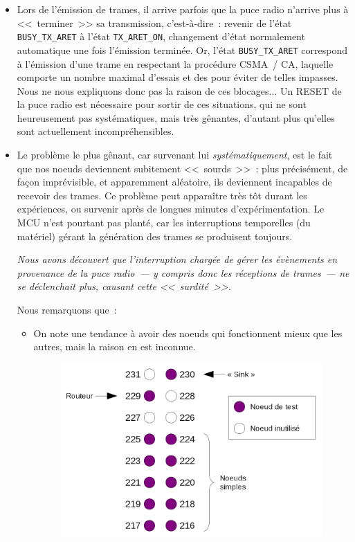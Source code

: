 \begin{itemize}
\item Lors de l'émission de trames, il arrive parfois que la puce radio
n'arrive plus à <<~terminer~>> sa transmission, c'est-à-dire~: revenir
de l'état \texttt{BUSY\_TX\_ARET} à l'état \texttt{TX\_ARET\_ON},
changement d'état normalement automatique une fois l'émission terminée.
Or, l'état \texttt{BUSY\_TX\_ARET} correspond à l'émission d'une trame
en respectant la procédure CSMA~/ CA\footnotemark[3], laquelle comporte
un nombre maximal d'essais et des  pour éviter de
telles impasses. Nous ne nous expliquons donc pas la raison de ces
blocages... Un RESET de la puce radio est nécessaire pour sortir de ces
situations, qui ne sont heureusement pas systématiques, mais très gênantes,
d'autant plus qu'elles sont actuellement incompréhensibles.


\item Le problème le plus gênant, car survenant lui \emph{systématiquement},
est le fait que nos noeuds deviennent subitement <<~sourds~>>~: plus
précisément, de façon imprévisible, et apparemment aléatoire, ils deviennent
incapables de recevoir des trames. Ce problème peut apparaître très tôt
durant les expériences, ou survenir après de longues minutes
d'expérimentation. Le MCU n'est pourtant pas planté, car les interruptions
temporelles (du  matériel) gérant la génération des trames
se produisent toujours.

\emph{Nous avons découvert que l'interruption chargée de gérer les
évènements en provenance de la puce radio~--- y compris donc les réceptions
de trames~--- ne se déclenchait plus, causant cette <<~surdité~>>.}

\bigskip

Nous remarquons que~:
\begin{itemize}
  \item On note une tendance à avoir des noeuds qui fonctionnent mieux
  que les autres, mais la raison en est inconnue.

\begin{figure}[!p]
\centering
\includegraphics[width=12cm]{images/ch6-disposition-pan-m3.png}
\label{FigDispoPANM3}
\end{figure}



\end{itemize}
\end{itemize}
